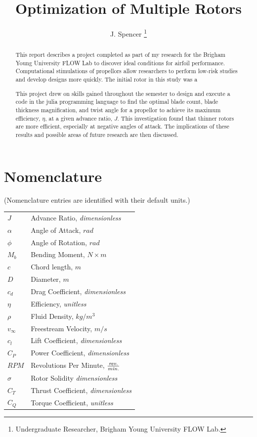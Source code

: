 \documentclass[journal ]{new-aiaa}
\title{Optimization of Multiple Rotors}
\author{J. Spencer \footnote{Undergraduate Researcher, Brigham Young University FLOW Lab.}}
\affil{Brigham Young University, Provo, Utah, 84601}
\begin{document}
\maketitle

\begin{abstract}

This report describes a project completed as part of my research for the Brigham Young University FLOW Lab to discover ideal conditions for airfoil performance. Computational stimulations of propellors allow researchers to perform low-risk studies and develop designs more quickly. The initial rotor in this study was a

This project drew on skills gained throughout the semester to design and execute a code in the julia programming language to find the optimal blade count, blade thickness magnification, and twist angle for a propellor to achieve its maximum efficiency, $\eta$, at a given advance ratio, $J$. This investigation found that thinner rotors are more efficient, especially at negative angles of attack. The implications of these results and possible areas of future research are then discussed.

\end{abstract}


\section*{Nomenclature}

\noindent(Nomenclature entries are identified with their default units.)

{\renewcommand\arraystretch{1.0}
\noindent\begin{longtable*}{@{}l @{\quad=\quad} l@{}}

$J$ & Advance Ratio, \emph{dimensionless} \\
$\alpha$ & Angle of Attack, $rad$ \\
$\phi$ & Angle of Rotation, $rad$ \\
$M_{b}$ & Bending Moment, $N \times m$ \\
$c$ & Chord length, $m$ \\
$D$ & Diameter, $m$ \\
$c_{d}$ & Drag Coefficient, \emph{dimensionless} \\
$\eta$ & Efficiency, \emph{unitless} \\
$\rho$ & Fluid Density, $kg/m^{3}$ \\
$v_{\infty}$ & Freestream Velocity, $m/s$ \\
$c_{l}$ & Lift Coefficient, \emph{dimensionless} \\
$C_{P}$ & Power Coefficient, \emph{dimensionless} \\
$RPM$ & Revolutions Per Minute, $\frac{\emph{rev.}}{\emph{min.}}$ \\
$\sigma$ & Rotor Solidity \emph{dimensionless} \\
$C_{T}$ & Thrust Coefficient, \emph{dimensionless} \\
$C_{Q}$ & Torque Coefficient, \emph{unitless} \\

\end{longtable*}}
\end{document}
